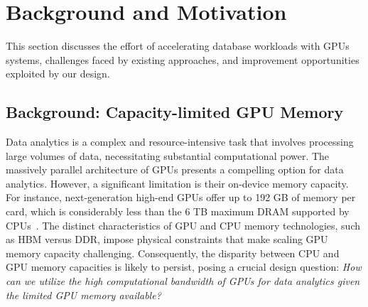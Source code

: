 \section{Background and Motivation} \label{section:background_motivation}
This section discusses the effort of accelerating database workloads with GPUs systems, challenges faced by existing approaches, and improvement opportunities exploited by our design.

\subsection{Background: Capacity-limited GPU Memory}
Data analytics is a complex and resource-intensive task that involves processing large volumes of data, necessitating substantial computational power. 
The massively parallel architecture of GPUs presents a compelling option for data analytics. 
However, a significant limitation is their on-device memory capacity. 
For instance, next-generation high-end GPUs offer up to 192 GB of memory per card, which is considerably less than the 6 TB maximum DRAM supported by CPUs~\cite{mi300x, genoa}. 
The distinct characteristics of GPU and CPU memory technologies, such as HBM versus DDR, impose physical constraints that make scaling GPU memory capacity challenging. 
Consequently, the disparity between CPU and GPU memory capacities is likely to persist, posing a crucial design question: \textit{How can we utilize the high computational bandwidth of GPUs for data analytics given the limited GPU memory available?}

\begin{comment}
Data analytics is time-consuming because we need to process a lot of data.
While GPUs provide high compute throughput and memory bandwidth compared to CPUs, their memory is much smaller and more expensive than CPUs.
The next-generation high-end GPUs contain up to 192 GB of memory per card, but it pales in comparison to the 6TB maximum DRAM a CPU can support.
On GPUs, a memory controller connects to a single GDDR or HBM chip, where each chip typically contains 4GB (GDDR6X) or 16GB (HBM3 with 8 layers).
Due to physical limitations, each GPU die can only connect to a limited number of DRAM chips (e.g. H100 GPU die only connects to 5 16GB HBM3 dies), capping the maximum amount of DRAM each GPU die can use.
On the other hand, each CPU memory controller connects to a channel with two DDR DIMM modules, each with 256GB, and today's CPU can contain 8-12 memory controllers.
As a result of how GPUs and CPUs organize memory, the gap in memory capacity is unlikely to be closed in the future.
This creates a dilemma for GPU-based data analytics.
Despite the high compute throughput provided by a GPU die, it only has access to a small piece of data.
On the other hand, we want to accelerate data analytics because we want to process big data.
\end{comment}

